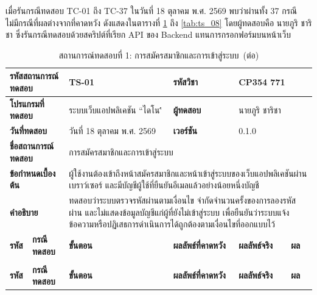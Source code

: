 เมื่อรันกรณีทดสอบ TC-01 ถึง TC-37 ในวันที่ 18 ตุลาคม พ.ศ. 2569 พบว่าผ่านทั้ง 37 กรณี ไม่มีกรณีที่ผลต่างจากที่คาดหวัง ดังแสดงในตารางที่ \ref{tab:test_cases} ถึง \ref{tab:ts_08} โดยผู้ทดสอบคือ นายภูริ ชาริชา ซึ่งรันกรณีทดสอบด้วยสคริปต์ที่เรียก API ของ Backend แทนการกรอกฟอร์มบนหน้าเว็บ
\begin{landscape}
{\small\setlength{\tabcolsep}{3pt}
\begin{longtable}{|p{}|p{}|p{}|p{}|p{}|>{\centering\arraybackslash}p{}|}
\caption{สถานการณ์ทดสอบที่ 1: การสมัครสมาชิกและการเข้าสู่ระบบ}\label{tab:test_cases}\\
\hline
\multicolumn{2}{|l|}{\textbf{รหัสสถานการณ์ทดสอบ}} & TS-01 & \textbf{รหัสวิชา} & \multicolumn{2}{l|}{CP354 771} \\ \hline
\multicolumn{2}{|l|}{\textbf{โปรแกรมที่ทดสอบ}} & ระบบเว็บแอปพลิเคชัน ``ไดโน\'\' & \textbf{ผู้ทดสอบ} & \multicolumn{2}{l|}{นายภูริ ชาริชา} \\ \hline
\multicolumn{2}{|l|}{\textbf{วันที่ทดสอบ}} & วันที่ 18 ตุลาคม พ.ศ. 2569 & \textbf{เวอร์ชัน} & \multicolumn{2}{l|}{0.1.0} \\ \hline
\multicolumn{2}{|l|}{\textbf{ชื่อสถานการณ์ทดสอบ}} & \multicolumn{4}{p{\dimexpr0.756\linewidth+18pt\relax}|}{การสมัครสมาชิกและการเข้าสู่ระบบ} \\ \hline
\multicolumn{2}{|l|}{\textbf{ข้อกำหนดเบื้องต้น}} & \multicolumn{4}{p{\dimexpr0.756\linewidth+18pt\relax}|}{ผู้ใช้งานต้องเข้าถึงหน้าสมัครสมาชิกและหน้าเข้าสู่ระบบของเว็บแอปพลิเคชันผ่านเบราว์เซอร์ และมีบัญชีผู้ใช้ที่ยืนยันอีเมลแล้วอย่างน้อยหนึ่งบัญชี} \\ \hline
\multicolumn{2}{|l|}{\textbf{คำอธิบาย}} & \multicolumn{4}{p{\dimexpr0.756\linewidth+18pt\relax}|}{ทดสอบว่าระบบตรวจรหัสผ่านตามเงื่อนไข จำกัดจำนวนครั้งของการลองรหัสผ่าน และไม่แสดงข้อมูลบัญชีแก่ผู้ที่ยังไม่เข้าสู่ระบบ เพื่อยืนยันว่าระบบแจ้งข้อความหรือปฏิเสธการดำเนินการได้ถูกต้องตามเงื่อนไขที่ออกแบบไว้} \\ \hline
\textbf{รหัส} & \textbf{กรณีทดสอบ} & \textbf{ขั้นตอน} & \textbf{ผลลัพธ์ที่คาดหวัง} & \textbf{ผลลัพธ์จริง} & \textbf{ผล} \\ \hline
\endfirsthead
\caption[]{สถานการณ์ทดสอบที่ 1: การสมัครสมาชิกและการเข้าสู่ระบบ~(\textnormal{ต่อ})}\\
\hline
\textbf{รหัส} & \textbf{กรณีทดสอบ} & \textbf{ขั้นตอน} & \textbf{ผลลัพธ์ที่คาดหวัง} & \textbf{ผลลัพธ์จริง} & \textbf{ผล} \\ \hline

\end{longtable}}
\end{landscape}
